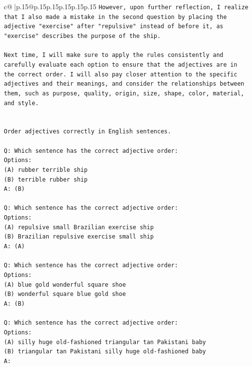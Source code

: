 \documentclass{article}
\begin{document}
{\begin{supertabular}{c@{$\;$}|p{.15\linewidth}@{}p{.15\linewidth}p{.15\linewidth}p{.15\linewidth}p{.15\linewidth}p{.15\linewidth}}
{{{\texttt{However, upon further reflection, I realize that I also made a mistake in the second question by placing the adjective "exercise" after "repulsive" instead of before it, as "exercise" describes the purpose of the ship. } \\
\\ 
\texttt{Next time, I will make sure to apply the rules consistently and carefully evaluate each option to ensure that the adjectives are in the correct order. I will also pay closer attention to the specific adjectives and their meanings, and consider the relationships between them, such as purpose, quality, origin, size, shape, color, material, and style.} \\
\\ 
\\ 
\texttt{Order adjectives correctly in English sentences.} \\
\\ 
\texttt{Q: Which sentence has the correct adjective order:} \\
\texttt{Options:} \\
\texttt{(A) rubber terrible ship} \\
\texttt{(B) terrible rubber ship} \\
\texttt{A: (B)} \\
\\ 
\texttt{Q: Which sentence has the correct adjective order:} \\
\texttt{Options:} \\
\texttt{(A) repulsive small Brazilian exercise ship} \\
\texttt{(B) Brazilian repulsive exercise small ship} \\
\texttt{A: (A)} \\
\\ 
\texttt{Q: Which sentence has the correct adjective order:} \\
\texttt{Options:} \\
\texttt{(A) blue gold wonderful square shoe} \\
\texttt{(B) wonderful square blue gold shoe} \\
\texttt{A: (B)} \\
\\ 
\texttt{Q: Which sentence has the correct adjective order:} \\
\texttt{Options:} \\
\texttt{(A) silly huge old{-}fashioned triangular tan Pakistani baby} \\
\texttt{(B) triangular tan Pakistani silly huge old{-}fashioned baby} \\
\texttt{A:} \\
            }
        }
    }
     \\ \\


\end{supertabular}}
\end{document}
